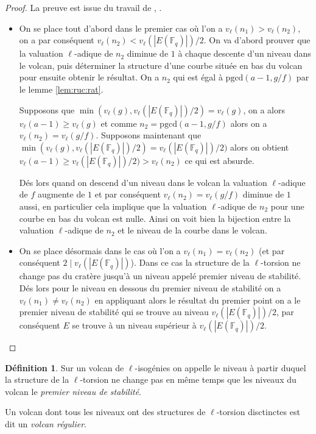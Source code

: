 \documentclass[10pt,a4paper]{book}
\theoremstyle{plain}
\theoremstyle{definition}
\theoremstyle{definition}
\theoremstyle{definition}
\theoremstyle{definition}
\newtheorem{defi}[thm]{Définition}
\theoremstyle{remark}
\theoremstyle{remark}
\theoremstyle{definition}
\begin{document}
\begin{proof}
La preuve est issue du travail de \cite{MiretMSTV08}, \cite{Ionica2010}.
\begin{itemize}
\item On se place tout d'abord dans le premier cas où l'on a $v_{\ell}(n_1)>v_{\ell}(n_2)$, on a par conséquent $v_{\ell}(n_2) < v_{\ell}(|E(\mathbb{F}_q)|)/2$. On va d'abord prouver que la valuation $\ell$-adique de $n_2$ diminue de $1$ à chaque descente d'un niveau dans le volcan, puis déterminer la structure d'une courbe située en bas du volcan pour ensuite obtenir le résultat.  On a $n_2$ qui est égal à $\mathrm{pgcd}(a-1,g/f)$ par le lemme \ref{lem:ruc:rat}.

Supposons que $\min(v_{\ell}(g),v_{\ell}(|E(\mathbb{F}_q)|)/2)= v_{\ell}(g)$, on a alors $v_{\ell}(a-1) \geqslant v_{\ell}(g)$ et comme $n_2=\mathrm{pgcd}(a-1,g/f)$ alors on a $v_{\ell}(n_2)=v_{\ell}(g/f)$. Supposons maintenant que $\min(v_{\ell}(g),v_{\ell}(|E(\mathbb{F}_q)|)/2)= v_{\ell}(|E(\mathbb{F}_q)|)/2)$ alors on obtient $v_{\ell}(a-1) \geqslant v_{\ell}(|E(\mathbb{F}_q)|)/2) > v_{\ell}(n_2)$ ce qui est absurde. 

Dés lors quand on descend d'un niveau dans le volcan la valuation $\ell$-adique de $f$ augmente de $1$ et par conséquent $v_{\ell}(n_2)=v_{\ell}(g/f)$ diminue de $1$ aussi, en particulier cela implique que la valuation $\ell$-adique de $n_2$ pour une courbe en bas du volcan est nulle. Ainsi on voit bien la bijection entre la valuation $\ell$-adique de $n_2$ et le niveau de la courbe dans le volcan.

\item On se place désormais dans le cas où l'on a $v_{\ell}(n_1)=v_{\ell}(n_2)$ (et par conséquent $2 \mid v_{\ell}(|E(\mathbb{F}_q)|)$). Dans ce cas la structure de la $\ell$-torsion ne change pas du cratère jusqu'à un niveau appelé premier niveau de stabilité. Dés lors pour le niveau en dessous du premier niveau de stabilité on a $v_{\ell}(n_1) \neq v_{\ell}(n_2)$ en appliquant alors le résultat du premier point on a le premier niveau de stabilité qui se trouve au niveau $v_{\ell}(|E(\mathbb{F}_q)|)/2$, par conséquent $E$ se trouve à un niveau supérieur à $v_{\ell}(|E(\mathbb{F}_q)|)/2$.
\end{itemize}
\end{proof}

\begin{defi}
Sur un volcan de $\ell$-isogénies on appelle le niveau à partir duquel la structure de la $\ell$-torsion ne change pas en même temps que les niveaux du volcan le \emph{premier niveau de stabilité}.

Un volcan dont tous les niveaux ont des structures de $\ell$-torsion disctinctes est dit un \emph{volcan régulier}.
\end{defi}
\end{document}
